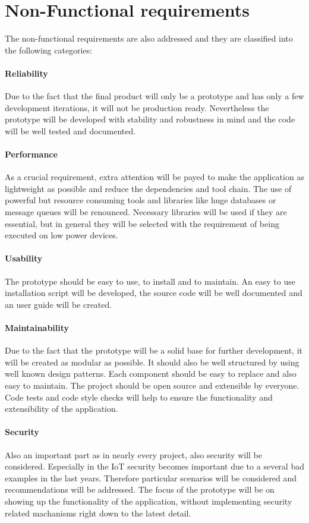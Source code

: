 \section{Non-Functional requirements}
\label{section:non-functional-requirements}
The non-functional requirements are also addressed and they are classified into the following categories:

\paragraph{Reliability} Due to the fact that the final product will only be a prototype and has only a few development iterations, it will not be production ready. Nevertheless the prototype will be developed with stability and robustness in mind and the code will be well tested and documented.
\paragraph{Performance} As a crucial requirement, extra attention will be payed to make the application as lightweight as possible and reduce the dependencies and tool chain.
The use of powerful but resource consuming tools and libraries like huge databases or message queues will be renounced.
Necessary libraries will be used if they are essential, but in general they will be selected with the requirement of being executed on low power devices.
\paragraph{Usability} The prototype should be easy to use, to install and to maintain.
An easy to use installation script will be developed, the source code will be well documented and an user guide will be created.
\paragraph{Maintainability} Due to the fact that the prototype will be a solid base for further development, it will be created as modular as possible.
It should also be well structured by using well known design patterns.
Each component should be easy to replace and also easy to maintain.
The project should be open source and extensible by everyone.
Code tests and code style checks will help to ensure the functionality and extensibility of the application.
\paragraph{Security} Also an important part as in nearly every project, also security will be considered.
Especially in the \ac{IoT} security becomes important due to a several bad examples in the last years.%
Therefore particular scenarios will be considered and recommendations will be addressed.
The focus of the prototype will be on showing up the functionality of the application, without implementing security related machanisms right down to the latest detail.
